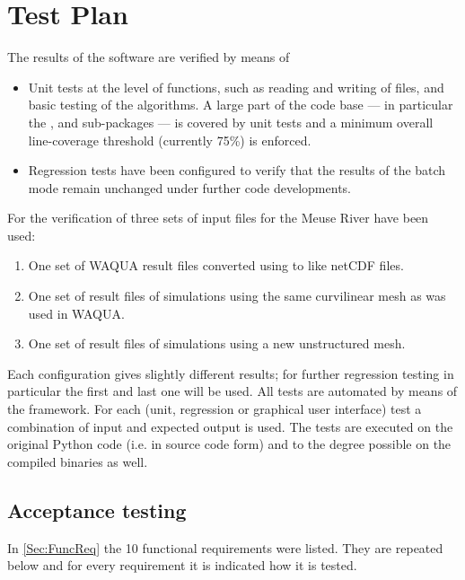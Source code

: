 \chapter{Test Plan} \label{Chp:TestPlan}

The results of the software are verified by means of

\begin{itemize}
\item Unit tests at the level of functions, such as reading and writing of files, and basic testing of the algorithms.
A large part of the code base --- in particular the ,  and  sub-packages --- is covered by unit tests and a minimum overall line-coverage threshold (currently 75\%) is enforced.
\item Regression tests have been configured to verify that the results of the batch mode remain unchanged under further code developments.
\end{itemize}

For the verification of \dfastbe three sets of input files for the Meuse River have been used:

\begin{enumerate}
\item One set of WAQUA result files converted using  to \dflowfm like netCDF files.
\item One set of \dflowfm result files of simulations using the same curvilinear mesh as was used in WAQUA.
\item One set of \dflowfm result files of simulations using a new unstructured mesh.
\end{enumerate}

Each configuration gives slightly different results; for further regression testing in particular the first and last one will be used.
All tests are automated by means of the  framework. For each (unit, regression or graphical user interface) test a combination of input and expected output is used.
The tests are executed on the original Python code (i.e. in source code form) and to the degree possible on the compiled binaries as well.

\section{Acceptance testing}

In \autoref{Sec:FuncReq} the 10 functional requirements were listed.
They are repeated below and for every requirement it is indicated how it is tested.

